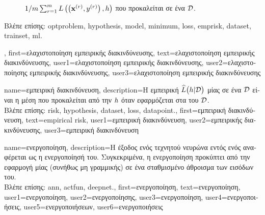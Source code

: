 {{\begin{figure}[H]
\begin{center}
{{				${1}/{m} \sum_{r=1}^m L\left(\left( {\bf x}^{(r)}, y^{(r)} \right),h \right)$ 
				\foreignlanguage{greek}{που προκαλείται σε ένα}  $\mathcal{D}$. \label{fig_erm_dict} } }
			\end{center}
		\end{figure} 
		\foreignlanguage{greek}{Βλέπε επίσης:} \gls{optproblem}, \gls{hypothesis}, \gls{model}, \gls{minimum}, \gls{loss}, \gls{emprisk}, 
		\gls{dataset}, \gls{trainset}, \gls{ml}.},
	first={\foreignlanguage{greek}{ελαχιστοποίηση εμπειρικής διακινδύνευσης}},
	text={\foreignlanguage{greek}{ελαχιστοποίηση εμπειρικής διακινδύνευσης}},
	user1={\foreignlanguage{greek}{ελαχιστοποίηση εμπειρικής διακινδύνευσης}}, %
	user2={\foreignlanguage{greek}{ελαχιστοποί\-ησης εμπειρικής διακινδύνευσης}}, %
	user3={\foreignlanguage{greek}{ελαχι\-στο\-ποί\-ηση εμπει\-ρι\-κής διακινδύνευσης}} %
}

{name={\foreignlanguage{greek}{εμπειρική διακινδύνευση}},
  description={\foreignlanguage{greek}{Η εμπειρική}  
	$\widehat{L}\big(h|\mathcal{D}\big)$ \foreignlanguage{greek}{μίας}  \foreignlanguage{greek}{σε ένα} 
	 $\mathcal{D}$ \foreignlanguage{greek}{είναι 
	η μέση}  \foreignlanguage{greek}{που προκαλείται από την 
  	$h$ όταν εφαρμόζεται στα}  \foreignlanguage{greek}{του} $\mathcal{D}$.\\
	\foreignlanguage{greek}{Βλέπε επίσης:} \gls{risk}, \gls{hypothesis}, \gls{dataset}, \gls{loss}, \gls{datapoint}.},
  first={\foreignlanguage{greek}{εμπειρική διακινδύνευση}},
  text={empirical risk},
  user1={\foreignlanguage{greek}{εμπειρική διακινδύνευση}}, %
  user2={\foreignlanguage{greek}{εμπειρικής διακινδύνευσης}}, %
  user3={\foreignlanguage{greek}{εμπειρική διακινδύνευση}} %
}

{name={\foreignlanguage{greek}{ενεργοποίηση}},
	description={\foreignlanguage{greek}{Η έξοδος ενός τεχνητού νευρώνα} 
		\foreignlanguage{greek}{εντός ενός}  \foreignlanguage{greek}{αναφέρεται ως η ενεργοποίησή 
		του. Συγκεκριμένα, η ενεργοποίηση προκύπτει από την εφαρμογή μίας (συνήθως μη γραμμικής)} 
	 	 \foreignlanguage{greek}{σε ένα σταθμισμένο άθροισμα των εισόδων του.} \\
		\foreignlanguage{greek}{Βλέπε επίσης:} \gls{ann}, \gls{actfun}, \gls{deepnet}.}, 
	first={\foreignlanguage{greek}{ενεργοποίηση}},
	text={\foreignlanguage{greek}{ενεργοποίηση}},
	user1={\foreignlanguage{greek}{ενεργοποίηση}}, %
	user2={\foreignlanguage{greek}{ενεργοποίησης}}, %
	user3={\foreignlanguage{greek}{ενεργοποίηση}}, %
	user4={\foreignlanguage{greek}{ενεργοποιήσεις}}, %
	user5={\foreignlanguage{greek}{ενεργοποιήσεων}}, %
	user6={\foreignlanguage{greek}{ενεργοποιήσεις}} %
}

